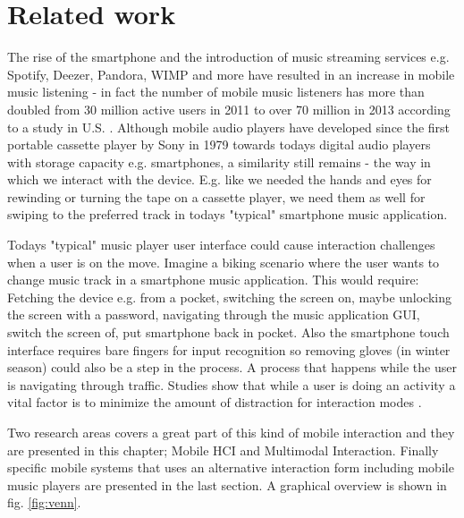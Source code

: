 \chapter{Related work}
\label{sec:relatedwork}
The rise of the smartphone and the introduction of music streaming services e.g. Spotify, Deezer, Pandora, WIMP and more have resulted in an increase in mobile music listening - in fact the number of mobile music listeners has more than doubled from 30 million active users in 2011 to over 70 million in 2013 according to a study in U.S. \cite{emarketer_music_2014}. Although mobile audio players have developed since the first portable cassette player by Sony in 1979 towards todays digital audio players with storage capacity e.g. smartphones, a similarity still remains - the way in which we interact with the device. E.g. like we needed the hands and eyes for rewinding or turning the tape on a cassette player, we need them as well for swiping to the preferred track in todays "typical" smartphone music application.

Todays "typical" music player user interface could cause interaction challenges when a user is on the move. Imagine a biking scenario where the user wants to change music track in a smartphone music application. This would require: Fetching the device e.g. from a pocket, switching the screen on, maybe unlocking the screen with a password, navigating through the music application GUI, switch the screen of, put smartphone back in pocket. Also the smartphone touch interface requires bare fingers for input recognition so removing gloves (in winter season) could also be a step in the process. A process that happens while the user is navigating through traffic. Studies show that while a user is doing an activity a vital factor is to minimize the amount of distraction for interaction modes \cite{pascoe_using_2000}.

Two research areas covers a great part of this kind of mobile interaction and they are presented in this chapter; Mobile HCI and Multimodal Interaction. Finally specific mobile systems that uses an alternative interaction form including mobile music players are presented in the last section. A graphical overview is shown in fig. \ref{fig:venn}.

